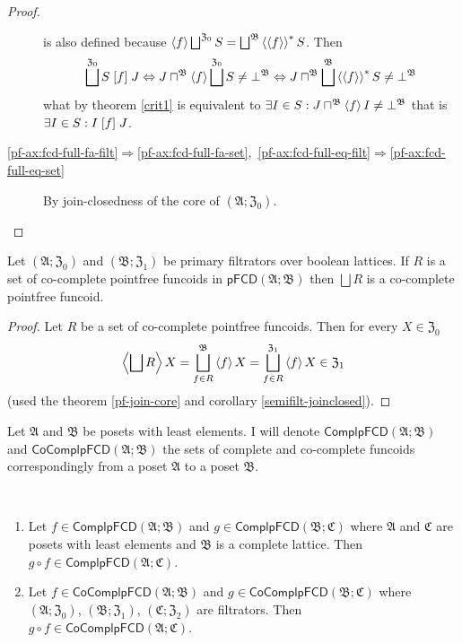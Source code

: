 \begin{proof}
\begin{description}
is also defined because $\left\langle f\right\rangle\bigsqcup^{\mathfrak{Z}_{0}}S=\bigsqcup^{\mathfrak{B}}\left\langle \left\langle f\right\rangle\right\rangle ^{\ast}S$.
Then
\[
\bigsqcup^{\mathfrak{Z}_{0}}S\mathrel{\left[f\right]}J\Leftrightarrow J\sqcap^{\mathfrak{B}}\left\langle f\right\rangle\bigsqcup^{\mathfrak{Z}_{0}}S\neq\bot^{\mathfrak{B}}\Leftrightarrow J\sqcap^{\mathfrak{B}}\bigsqcup^{\mathfrak{B}}\left\langle \left\langle f\right\rangle\right\rangle ^{\ast}S\neq\bot^{\mathfrak{B}}
\]
what by theorem \ref{crit1} is equivalent to $\exists I\in S:J\sqcap^{\mathfrak{B}}\left\langle f\right\rangle I\neq\bot^{\mathfrak{B}}$
that is $\exists I\in S:I\mathrel{\left[f\right]}J$.
\item [{\ref{pf-ax:fcd-full-fa-filt}$\Rightarrow$\ref{pf-ax:fcd-full-fa-set},~\ref{pf-ax:fcd-full-eq-filt}$\Rightarrow$\ref{pf-ax:fcd-full-eq-set}}] By
join-closedness of the core of $(\mathfrak{A};\mathfrak{Z}_{0})$.
\end{description}
\end{proof}
\begin{thm}
\label{pf-join-cocompl}Let $(\mathfrak{A};\mathfrak{Z}_{0})$ and
$(\mathfrak{B};\mathfrak{Z}_{1})$ be primary filtrators over boolean
lattices. If $R$ is a set of co-complete pointfree funcoids in $\mathsf{pFCD}(\mathfrak{A};\mathfrak{B})$
then $\bigsqcup R$ is a co-complete pointfree funcoid.\end{thm}
\begin{proof}
Let $R$ be a set of co-complete pointfree funcoids. Then for every
$X\in\mathfrak{Z}_{0}$
\[
\left\langle \bigsqcup R\right\rangle X=\bigsqcup_{f\in R}^{\mathfrak{B}}\left\langle f\right\rangle X=\bigsqcup_{f\in R}^{\mathfrak{Z}_{1}}\left\langle f\right\rangle X\in\mathfrak{Z}_{1}
\]
(used the theorem \ref{pf-join-core} and corollary \ref{semifilt-joinclosed}).
\end{proof}
Let $\mathfrak{A}$ and $\mathfrak{B}$ be posets with least elements.
I will denote $\mathsf{ComplpFCD}(\mathfrak{A};\mathfrak{B})$ and
$\mathsf{CoComplpFCD}(\mathfrak{A};\mathfrak{B})$ the sets of complete
and co-complete funcoids correspondingly from a poset $\mathfrak{A}$
to a poset $\mathfrak{B}$.
\begin{prop}
~
\begin{enumerate}
\item \label{pf-compl-comp}Let $f\in\mathsf{ComplpFCD}(\mathfrak{A};\mathfrak{B})$
and $g\in\mathsf{ComplpFCD}(\mathfrak{B};\mathfrak{C})$ where $\mathfrak{A}$
and $\mathfrak{C}$ are posets with least elements and $\mathfrak{B}$
is a complete lattice. Then $g\circ f\in\mathsf{ComplpFCD}(\mathfrak{A};\mathfrak{C})$.
\item \label{pf-cocompl-comp}Let $f\in\mathsf{CoComplpFCD}(\mathfrak{A};\mathfrak{B})$
and $g\in\mathsf{CoComplpFCD}(\mathfrak{B};\mathfrak{C})$ where 
$(\mathfrak{A};\mathfrak{Z}_{0})$, $(\mathfrak{B};\mathfrak{Z}_{1})$,
$(\mathfrak{C};\mathfrak{Z}_{2})$ are filtrators. Then $g\circ f\in\mathsf{CoComplpFCD}(\mathfrak{A};\mathfrak{C})$.
\end{enumerate}
\end{prop}
